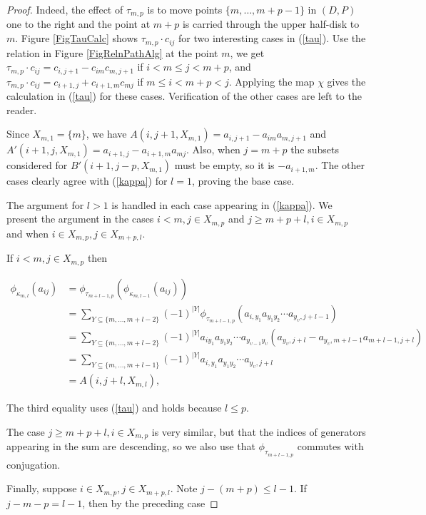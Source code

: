 \documentclass[11pt]{amsart}
\def\t{{\tau}}
\def\k{{\kappa}}
\def\u{\upsilon}
\theoremstyle{definition}
\begin{document}
\begin{proof}
Indeed, the effect of $\tau_{m,p}$ is to move points $\{m,\ldots,m+p-1\}$ in $(D,P)$ one to the right and the point at $m+p$ is carried through the upper half-disk to $m$. Figure \ref{FigTauCalc} shows $\t_{m,p}\cdot c_{ij}$ for two interesting cases in (\ref{tau}). Use the relation in Figure \ref{FigRelnPathAlg} at the point $m$, we get $\t_{m,p}\cdot c_{ij} = c_{i,j+1}-c_{im}c_{m,j+1}$ if $i<m\le j<m+p$, and $\t_{m,p}\cdot c_{ij} = c_{i+1,j}+c_{i+1,m}c_{mj}$ if $m\le i<m+p<j$. Applying the map $\chi$ gives the calculation in (\ref{tau}) for these cases. Verification of the other cases are left to the reader.

Since $X_{m,1}=\{m\}$, we have $A(i,j+1,X_{m,1})=a_{i,j+1}-a_{im}a_{m,j+1}$ and $A'(i+1,j,X_{m,1})=a_{i+1,j}-a_{i+1,m}a_{mj}$. Also, when $j=m+p$ the subsets considered for $B'(i+1,j-p,X_{m,1})$ must be empty, so it is $-a_{i+1,m}$. The other cases clearly agree with (\ref{kappa}) for $l=1$, proving the base case.

The argument for $l>1$ is handled in each case appearing in (\ref{kappa}).  We present the argument in the cases $i<m,j\in X_{m,p}$ and $j\ge m+p+l,i\in X_{m,p}$ and when $i\in X_{m,p}, j\in X_{m+p,l}$.

If $i<m, j\in X_{m,p}$ then

\begin{align*}
\phi_{\k_{m,l}}(a_{ij}) &= \phi_{\t_{m+l-1,p}}(\phi_{\k_{m,l-1}}(a_{ij}))\\
&= \sum_{{\scriptscriptstyle Y\subseteq \{m,\ldots,m+l-2\}}} (-1)^{|Y|} \phi_{\t_{m+l-1,p}}(a_{i,y_1}a_{y_1y_2}\cdots a_{y_\u,j+l-1})\\
&= \sum_{{\scriptscriptstyle Y\subseteq \{m,\ldots,m+l-2\}}} (-1)^{|Y|} a_{iy_1}a_{y_1y_2}\cdots a_{y_{\u-1}y_\u}(a_{y_\u,j+l}-a_{y_\u,m+l-1}a_{m+l-1,j+l})\\
&= \sum_{{\scriptscriptstyle Y\subseteq \{m,\ldots,m+l-1\}}} (-1)^{|Y|} a_{i,y_1}a_{y_1y_2}\cdots a_{y_\u,j+l}\\
&= A(i,j+l,X_{m,l}),
\end{align*}

The third equality uses (\ref{tau}) and holds because $l\le p$. 

The case $j\ge m+p+l,i\in X_{m,p}$ is very similar, but that the indices of generators appearing in the sum are descending, so we also use that $\phi_{\t_{m+l-1,p}}$ commutes with conjugation.

Finally, suppose $i\in X_{m,p},j\in X_{m+p,l}$. Note $j-(m+p)\le l-1$. If $j-m-p=l-1$, then by the preceding case


\end{proof}
\end{document}
